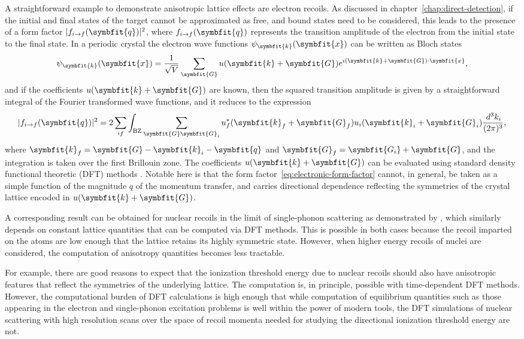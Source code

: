 \documentclass[b5paper, 10pt, twoside]{book}
\renewcommand{\vec}[1]{\symbfit{#1}}
\newcommand{\difd}{\,d}
\begin{document}
A straightforward example to demonstrate anisotropic lattice effects are electron recoils. As discussed in chapter~\ref{chap:direct-detection}, if the initial and final states of the target cannot be approximated as free, and bound states need to be considered, this leads to the presence of a form factor $|f_{i\rightarrow f}(\vec{q})|^2$, where $f_{i\rightarrow f}(\vec{q})$ represents the transition amplitude of the electron from the initial state to the final state. In a periodic crystal the electron wave functions $\psi_{\vec{k}}(\vec{x})$ can be written as Bloch states
\begin{equation}
\psi_{\vec{k}}(\vec{x})=\frac{1}{\sqrt{V}}\sum_{\vec{G}}u(\vec{k}+\vec{G})e^{i(\vec{k}+\vec{G})\cdot\vec{x}},
\end{equation}
and if the coefficients $u(\vec{k}+\vec{G})$ are known, then the squared transition amplitude is given by a straightforward integral of the Fourier transformed wave functions, and it reduces to the expression
\begin{equation}
|f_{i\rightarrow f}(\vec{q})|^2=2\sum_{if}\int_\text{BZ}\sum_{\vec{G}\vec{G}_i}u_f^*(\vec{k}_f+\vec{G}_f)u_i(\vec{k}_i+\vec{G}_i)\frac{\difd^3 k_i}{(2\pi)^3},
\label{eq:electronic-form-factor}
\end{equation}
where $\vec{k}_f=\vec{G}-\vec{k}_i-\vec{q}$ and $\vec{G}_f=\vec{G_i}+\vec{G}$, and the integration is taken over the first Brillouin zone. The coefficients $u(\vec{k}+\vec{G})$ can be evaluated using standard density functional theoretic (DFT) methods \parencite{EssigEtAl2015}. Notable here is that the form factor~\eqref{eq:electronic-form-factor} cannot, in general, be taken as a simple function of the magnitude $q$ of the momentum transfer, and carries directional dependence reflecting the symmetries of the crystal lattice encoded in $u(\vec{k}+\vec{G})$.

A corresponding result can be obtained for nuclear recoils in the limit of single-phonon scattering as demonstrated by \textcite{TrickleEtAl2020}, which similarly depends on constant lattice quantities that can be computed via DFT methods. This is possible in both cases because the recoil imparted on the atoms are low enough that the lattice retains its highly symmetric state. However, when higher energy recoils of nuclei are considered, the computation of anisotropy quantities becomes less tractable.

For example, there are good reasons to expect that the ionization threshold energy due to nuclear recoils should also have anisotropic features that reflect the symmetries of the underlying lattice. The computation is, in principle, possible with time-dependent DFT methods. However, the computational burden of DFT calculations is high enough that while computation of equilibrium quantities such as those appearing in the electron and single-phonon excitation problems is well within the power of modern tools, the DFT simulations of nuclear scattering with high resolution scans over the space of recoil momenta needed for studying the directional ionization threshold energy are not.
\end{document}
